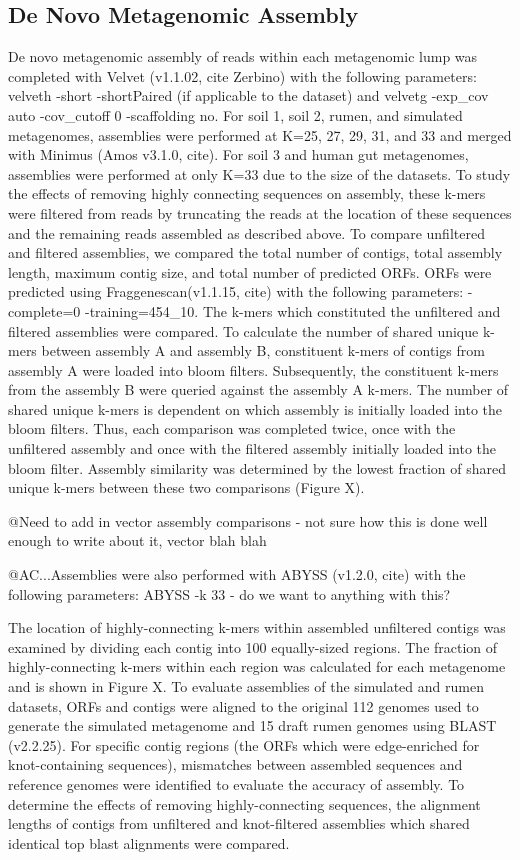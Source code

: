 \documentclass[11pt]{article} %
\begin{document}
\subsection{De Novo Metagenomic Assembly}
De novo metagenomic assembly of reads within each metagenomic lump
was completed with Velvet (v1.1.02, cite Zerbino) with the following
parameters: velveth -short -shortPaired (if applicable to the dataset)
and velvetg -exp\_cov auto -cov\_cutoff 0 -scaffolding no.  For soil 1, soil 2, rumen, and simulated metagenomes, assemblies were performed at K=25, 27, 29, 31, and 33 and merged with Minimus (Amos v3.1.0, cite).  For soil 3 and human gut metagenomes, assemblies were performed at only K=33 due to the size of the datasets.  
	To study the effects of removing highly connecting sequences on assembly, these k-mers were filtered from reads by truncating the reads at the location of these sequences and the remaining reads assembled as described above.  To compare unfiltered and filtered assemblies, we compared the total number of contigs, total assembly length, maximum contig size, and total number of predicted ORFs.  ORFs were predicted using Fraggenescan(v1.1.15, cite) with the following parameters: -complete=0 -training=454\_10.  The k-mers which constituted the unfiltered and filtered assemblies were compared.  To calculate the number of shared unique k-mers between assembly A and assembly B, constituent k-mers of contigs from assembly A were loaded into bloom filters. Subsequently, the constituent k-mers from the assembly B were queried against
the assembly A k-mers. The number of shared unique k-mers is
dependent on which assembly is initially loaded into the bloom filters. Thus, each comparison was completed twice, once with the unfiltered
assembly and once with the filtered assembly initially loaded into the bloom
filter. Assembly similarity was determined by the lowest fraction
of shared unique k-mers between these two comparisons (Figure X). 

@Need to add in vector assembly comparisons - not sure how this is done well enough to write about it, vector blah blah

@AC...Assemblies were also performed with ABYSS (v1.2.0, cite) with the following parameters: ABYSS -k 33  - do we want to anything with this?

	The location of highly-connecting k-mers within assembled unfiltered contigs was examined by dividing each contig into 100 equally-sized regions.  The fraction of highly-connecting k-mers within each region was calculated for each metagenome and is shown in Figure X.
	To evaluate assemblies of the simulated and rumen datasets, ORFs and contigs were aligned to the original 112 genomes used to generate the simulated metagenome and 15 draft rumen genomes  \cite{Hess:2011p686} using BLAST (v2.2.25).  For specific contig regions (the ORFs which were edge-enriched for knot-containing sequences), mismatches between assembled sequences and reference genomes were identified to evaluate the accuracy of assembly.  To determine the effects of removing highly-connecting sequences, the alignment lengths of contigs from unfiltered and knot-filtered assemblies which shared identical top blast alignments were compared.    




\end{document}
